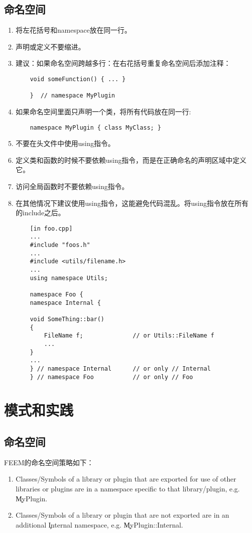 \subsection{命名空间}
\begin{enumerate}
	\item 将左花括号和namespace放在同一行。
	\item 声明或定义不要缩进。
	\item 建议：如果命名空间跨越多行：在右花括号重复命名空间后添加注释：
	\begin{lstlisting}
	void someFunction() { ... }
	
	}  // namespace MyPlugin
	\end{lstlisting}
	
	\item 如果命名空间里面只声明一个类，将所有代码放在同一行:
	\begin{lstlisting}
	namespace MyPlugin { class MyClass; }
	\end{lstlisting}
	
	\item 不要在头文件中使用using指令。
	\item 定义类和函数的时候不要依赖using指令，而是在正确命名的声明区域中定义它。
	\item 访问全局函数时不要依赖using指令。
	\item 在其他情况下建议使用using指令，这能避免代码混乱。将using指令放在所有的include之后。
	\begin{lstlisting}
	[in foo.cpp]
	...
	#include "foos.h"
	...
	#include <utils/filename.h>
	...
	using namespace Utils;
	
	namespace Foo {
	namespace Internal {
	
	void SomeThing::bar()
	{
		FileName f;              // or Utils::FileName f
		...
	}
	...
	} // namespace Internal      // or only // Internal
	} // namespace Foo           // or only // Foo
	\end{lstlisting}
	
\end{enumerate}
\section{模式和实践}
\subsection{命名空间}
FEEM的命名空间策略如下：
\begin{enumerate}
	\item Classes/Symbols of a library or plugin that are exported for use of other libraries or plugins are in a namespace specific to that library/plugin, e.g. \c{MyPlugin}.
	\item Classes/Symbols of a library or plugin that are not exported are in an additional \c{Internal} namespace, e.g. \c{MyPlugin::Internal}.
\end{enumerate}

